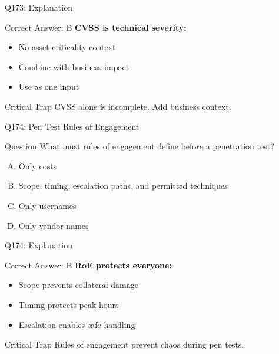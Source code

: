 \documentclass{beamer}
\begin{document}
	\begin{frame}{Q173: Explanation}
		\begin{block}{Correct Answer: B}
			\textbf{CVSS is technical severity:}
			\begin{itemize}
				\item No asset criticality context
				\item Combine with business impact
				\item Use as one input
			\end{itemize}
		\end{block}
		\begin{alertblock}{Critical Trap}
			CVSS alone is incomplete. Add business context.
		\end{alertblock}
	\end{frame}
	
	\begin{frame}{Q174: Pen Test Rules of Engagement}
		\begin{block}{Question}
			What must rules of engagement define before a penetration test?
		\end{block}
		\begin{enumerate}[(A)]
			\item Only costs
			\item Scope, timing, escalation paths, and permitted techniques
			\item Only usernames
			\item Only vendor names
		\end{enumerate}
	\end{frame}
	
	\begin{frame}{Q174: Explanation}
		\begin{block}{Correct Answer: B}
			\textbf{RoE protects everyone:}
			\begin{itemize}
				\item Scope prevents collateral damage
				\item Timing protects peak hours
				\item Escalation enables safe handling
			\end{itemize}
		\end{block}
		\begin{alertblock}{Critical Trap}
			Rules of engagement prevent chaos during pen tests.
		\end{alertblock}
	\end{frame}
	
\end{document}
